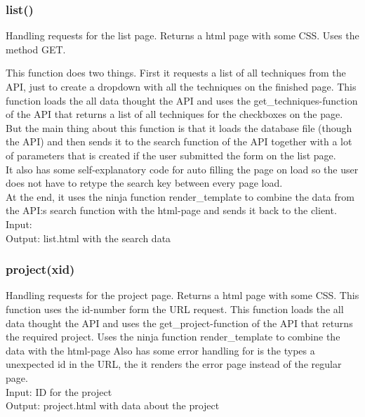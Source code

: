 \documentclass{TDP003mall}
\begin{document}
\subsubsection{list()}
    Handling requests for the list page. Returns a html page with some CSS. Uses the method GET.
    
    This function does two things. First it requests a list of all techniques from the API, just to create a dropdown with all the techniques on the finished page.
    This function loads the all data thought the API and uses the get\_techniques-function of the API that returns a list of all techniques for the checkboxes on the page.\\
    
    But the main thing about this function is that it loads the database file (though the API) and then sends it to the search function of the API together with a lot of parameters that is created if the user submitted the form on the list page.\\
    
    It also has some self-explanatory code for auto filling the page on load so the user does not have to retype the search key between every page load.\\

    At the end, it uses the ninja function render\_template to combine the data from the API:s search function with the html-page and sends it back to the client.\\

    Input:\\
    Output: list.html with the search data\\
\subsubsection{project(xid)}
    Handling requests for the project page. Returns a html page with some CSS. This function uses the id-number form the URL request.
    This function loads the all data thought the API and uses the get\_project-function of the API that returns the required project.
    Uses the ninja function render\_template to combine the data with the html-page
    Also has some error handling for is the types a unexpected id in the URL, the it renders the error page instead of the regular page.\\

    Input: ID for the project\\
    Output: project.html with data about the project\\
\end{document}
